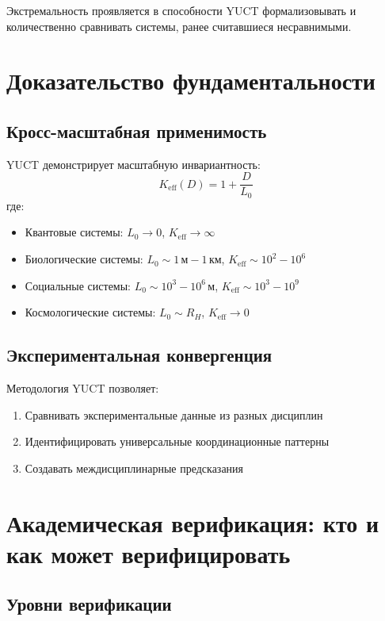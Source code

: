 \documentclass[12pt,a4paper]{article}
\begin{document}
	Экстремальность проявляется в способности YUCT формализовывать и количественно сравнивать системы, ранее считавшиеся несравнимыми.
	
	\section{Доказательство фундаментальности}
	
	\subsection{Кросс-масштабная применимость}
	
	YUCT демонстрирует масштабную инвариантность:
	\[
	K_{\mathrm{eff}}(D) = 1 + \frac{D}{L_0}
	\]
	где:
	\begin{itemize}
		\item Квантовые системы: $L_0 \to 0$, $K_{\mathrm{eff}} \to \infty$
		\item Биологические системы: $L_0 \sim 1\,\text{м}-1\,\text{км}$, $K_{\mathrm{eff}} \sim 10^2-10^6$
		\item Социальные системы: $L_0 \sim 10^3-10^6\,\text{м}$, $K_{\mathrm{eff}} \sim 10^3-10^9$
		\item Космологические системы: $L_0 \sim R_H$, $K_{\mathrm{eff}} \to 0$
	\end{itemize}
	
	\subsection{Экспериментальная конвергенция}
	
	Методология YUCT позволяет:
	\begin{enumerate}
		\item Сравнивать экспериментальные данные из разных дисциплин
		\item Идентифицировать универсальные координационные паттерны
		\item Создавать междисциплинарные предсказания
	\end{enumerate}
	
	\section{Академическая верификация: кто и как может верифицировать}
	
	\subsection{Уровни верификации}
	
\end{document}
